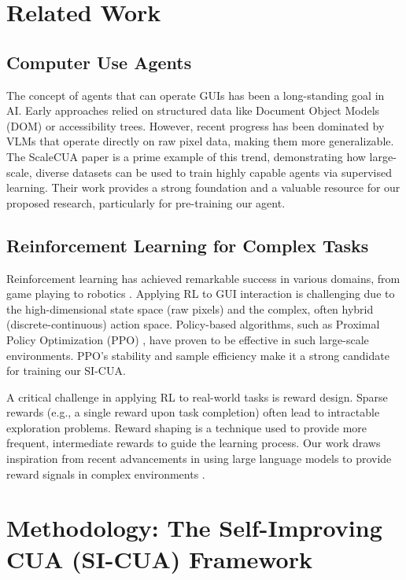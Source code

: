 \documentclass{article}
\begin{document}
\section{Related Work}

\subsection{Computer Use Agents}
The concept of agents that can operate GUIs has been a long-standing goal in AI. Early approaches relied on structured data like Document Object Models (DOM) or accessibility trees. However, recent progress has been dominated by VLMs that operate directly on raw pixel data, making them more generalizable. The ScaleCUA paper \cite{liu2025scalecua} is a prime example of this trend, demonstrating how large-scale, diverse datasets can be used to train highly capable agents via supervised learning. Their work provides a strong foundation and a valuable resource for our proposed research, particularly for pre-training our agent.

\subsection{Reinforcement Learning for Complex Tasks}
Reinforcement learning has achieved remarkable success in various domains, from game playing \cite{silver2016mastering} to robotics \cite{levine2016end}. Applying RL to GUI interaction is challenging due to the high-dimensional state space (raw pixels) and the complex, often hybrid (discrete-continuous) action space. Policy-based algorithms, such as Proximal Policy Optimization (PPO) \cite{schulman2017proximal}, have proven to be effective in such large-scale environments. PPO's stability and sample efficiency make it a strong candidate for training our SI-CUA.

A critical challenge in applying RL to real-world tasks is reward design. Sparse rewards (e.g., a single reward upon task completion) often lead to intractable exploration problems. Reward shaping \cite{ng1999policy} is a technique used to provide more frequent, intermediate rewards to guide the learning process. Our work draws inspiration from recent advancements in using large language models to provide reward signals in complex environments \cite{goyal2023chatgpt}.

\section{Methodology: The Self-Improving CUA (SI-CUA) Framework}
\end{document}
